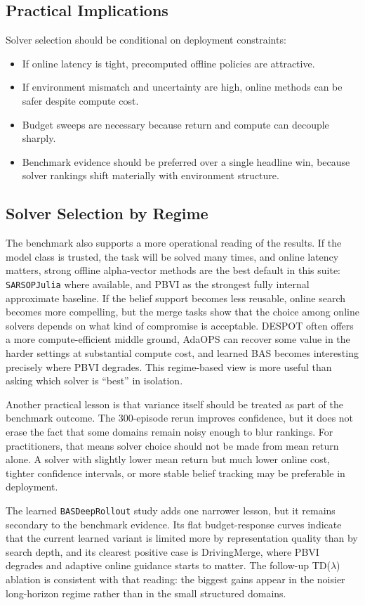 \documentclass[10pt,twocolumn]{article}
\begin{document}
\subsection{Practical Implications}
Solver selection should be conditional on deployment constraints:
\begin{itemize}
    \item If online latency is tight, precomputed offline policies are attractive.
    \item If environment mismatch and uncertainty are high, online methods can be safer despite compute cost.
    \item Budget sweeps are necessary because return and compute can decouple sharply.
    \item Benchmark evidence should be preferred over a single headline win, because solver rankings shift materially with environment structure.
\end{itemize}

\subsection{Solver Selection by Regime}
The benchmark also supports a more operational reading of the results. If the model class is trusted, the task will be solved many times, and online latency matters, strong offline alpha-vector methods are the best default in this suite: \texttt{SARSOPJulia} where available, and PBVI as the strongest fully internal approximate baseline. If the belief support becomes less reusable, online search becomes more compelling, but the merge tasks show that the choice among online solvers depends on what kind of compromise is acceptable. DESPOT often offers a more compute-efficient middle ground, AdaOPS can recover some value in the harder settings at substantial compute cost, and learned BAS becomes interesting precisely where PBVI degrades. This regime-based view is more useful than asking which solver is ``best'' in isolation.

Another practical lesson is that variance itself should be treated as part of the benchmark outcome. The 300-episode rerun improves confidence, but it does not erase the fact that some domains remain noisy enough to blur rankings. For practitioners, that means solver choice should not be made from mean return alone. A solver with slightly lower mean return but much lower online cost, tighter confidence intervals, or more stable belief tracking may be preferable in deployment.

The learned \texttt{BASDeepRollout} study adds one narrower lesson, but it remains secondary to the benchmark evidence. Its flat budget-response curves indicate that the current learned variant is limited more by representation quality than by search depth, and its clearest positive case is DrivingMerge, where PBVI degrades and adaptive online guidance starts to matter. The follow-up TD($\lambda$) ablation is consistent with that reading: the biggest gains appear in the noisier long-horizon regime rather than in the small structured domains.
\end{document}
